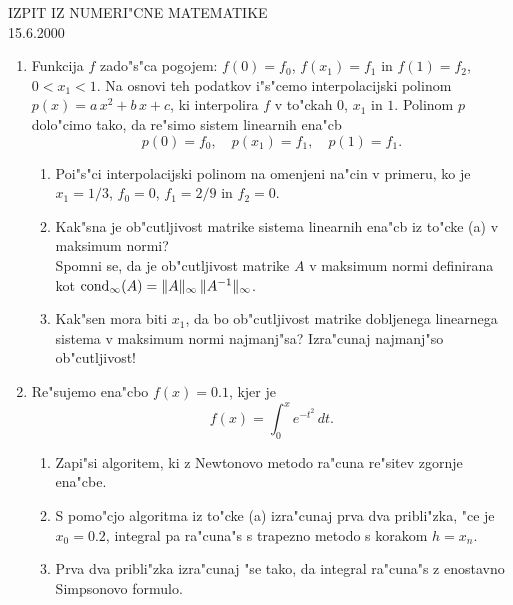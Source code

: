 

  \begin{center}
    {\Large IZPIT IZ NUMERI"CNE MATEMATIKE}\\
    15.6.2000
  \end{center}
\begin{enumerate}

  \item Funkcija $f$ zado"s"ca pogojem: $f(0)=f_0$, $f(x_1)=f_1$
  in $f(1)=f_2$, $0< x_1<1$. Na osnovi teh podatkov 
  i"s"cemo interpolacijski
  polinom $p(x)=a\,x^2+b\,x+c$, ki interpolira
  $f$ v to"ckah $0$, $x_1$ in $1$. Polinom $p$ dolo"cimo
  tako, da re"simo sistem linearnih ena"cb
  $$p(0)=f_0,\quad p(x_1)=f_1,\quad p(1)=f_1.$$

  \begin{enumerate}
   
     \item Poi"s"ci interpolacijski polinom na omenjeni na"cin
     v primeru, ko je $x_1=1/3$, $f_0=0$, $f_1=2/9$ in
     $f_2=0$.

     \item Kak"sna je ob"cutljivost matrike sistema linearnih
     ena"cb iz to"cke (a) v maksimum normi?\\
     Spomni se, da je ob"cutljivost matrike $A$ v maksimum normi
     definirana kot ${\rm cond}_\infty(A)=\|A\|_\infty\,
     \|A^{-1}\|_\infty$.

     \item  Kak"sen mora biti $x_1$, da bo ob"cutljivost matrike
     dobljenega linearnega sistema v maksimum normi najmanj"sa?
     Izra"cunaj najmanj"so ob"cutljivost!
  \end{enumerate}

  \item Re"sujemo ena"cbo $f(x)=0.1$, kjer je 
        $$f(x)=\int_{0}^{x}e^{-t^2}\,dt.$$
        
        \begin{enumerate}
         
           
          \item Zapi"si algoritem, ki z Newtonovo metodo ra"cuna re"sitev
                zgornje ena"cbe.
          \item S pomo"cjo algoritma iz to"cke (a) izra"cunaj prva dva 
                pribli"zka, "ce je $x_0=0.2$, integral pa ra"cuna"s s
                trapezno metodo s korakom $h=x_n$.
          
          \item Prva dva pribli"zka izra"cunaj "se tako, da integral 
                ra"cuna"s z enostavno Simpsonovo formulo.
        \end{enumerate}  

\end{enumerate}


